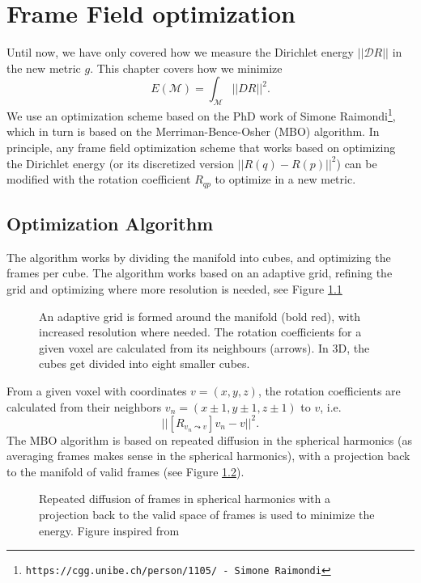 \documentclass[../thesis.tex]{subfiles}
\begin{document}
\chapter{Frame Field optimization}
\label{ch:optimization}
Until now, we have only covered how we measure the Dirichlet energy $||\mathcal{D}R||$ in
the new metric $g$.
This chapter covers how we minimize
$$E(\mathcal{M})=\int_{\mathcal{M}}||DR||^2.$$
We use an optimization scheme based on the PhD work of Simone Raimondi\footnote{\texttt{https://cgg.unibe.ch/person/1105/ - Simone Raimondi}}, which in turn is based
on the Merriman-Bence-Osher (MBO) algorithm.
In principle, any frame field optimization scheme that works based on
optimizing the Dirichlet energy (or its discretized version $||R(q)-R(p)||^2$) can be
modified with the rotation coefficient $R_{qp}$ to optimize in a new metric.
\section{Optimization Algorithm}
The algorithm works by dividing the manifold into cubes,
and optimizing the frames per cube. The algorithm works based on an adaptive
grid, refining the grid and optimizing where more resolution is needed, see Figure \ref{fig:grid} 
\begin{figure}[htb]
    \centering
    \def\svgwidth{20em}
    
    \caption{An adaptive grid is formed around the manifold (bold red), with increased resolution where needed.
    The rotation coefficients for a given voxel are calculated from its neighbours (arrows).
    In 3D, the cubes get divided into eight smaller cubes.}
    \label{fig:grid}
\end{figure}
From a given voxel with coordinates $v=(x,y,z)$, the rotation coefficients
are calculated from their neighbors $v_n=(x\pm 1,y\pm 1,z\pm 1)$ to $v$,
i.e. $$||[R_{v_n\leadsto v}]v_n - v||^2.$$
The MBO algorithm is based on repeated diffusion in the spherical harmonics (as averaging frames
makes sense in the spherical harmonics), with a projection back to the manifold
of valid frames (see Figure \ref{fig:diffusionprojection}).
\begin{figure}[htb]
    \centering
    \def\svgwidth{20em}
    
    \caption{Repeated diffusion of frames in spherical harmonics with a projection back to the
    valid space of frames is used to minimize the energy. Figure inspired from~\cite{Palmer} }
    \label{fig:diffusionprojection}
\end{figure}
\end{document}
